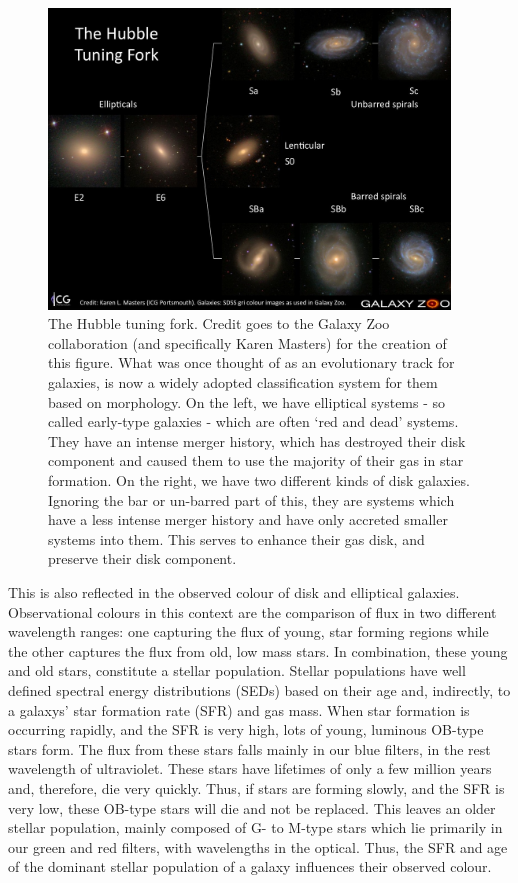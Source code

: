 \begin{figure}
\centering
\includegraphics[width=0.95\textwidth]{Introduction/figures/hubble-tuning-fork.jpg}
\caption[The Hubble tuning fork.]{The Hubble tuning fork. Credit goes to the Galaxy Zoo collaboration (and specifically Karen Masters) for the creation of this figure. What was once thought of as an evolutionary track for galaxies, is now a widely adopted classification system for them based on morphology. On the left, we have elliptical systems - so called early-type galaxies - which are often `red and dead' systems. They have an intense merger history, which has destroyed their disk component and caused them to use the majority of their gas in star formation. On the right, we have two different kinds of disk galaxies. Ignoring the bar or un-barred part of this, they are systems which have a less intense merger history and have only accreted smaller systems into them. This serves to enhance their gas disk, and preserve their disk component.}
\label{fig:hubble-tuning}
\end{figure}

This is also reflected in the observed colour of disk and elliptical galaxies. Observational colours in this context are the comparison of flux in two different wavelength ranges: one capturing the flux of young, star forming regions while the other captures the flux from old, low mass stars. In combination, these young and old stars, constitute a stellar population. Stellar populations have well defined spectral energy distributions (SEDs) based on their age and, indirectly, to a galaxys' star formation rate (SFR) and gas mass. When star formation is occurring rapidly, and the SFR is very high, lots of young, luminous OB-type stars form. The flux from these stars falls mainly in our blue filters, in the rest wavelength of ultraviolet. These stars have lifetimes of only a few million years and, therefore, die very quickly. Thus, if stars are forming slowly, and the SFR is very low, these OB-type stars will die and not be replaced. This leaves an older stellar population, mainly composed of G- to M-type stars which lie primarily in our green and red filters, with wavelengths in the optical. Thus, the SFR and age of the dominant stellar population of a galaxy influences their observed colour.


